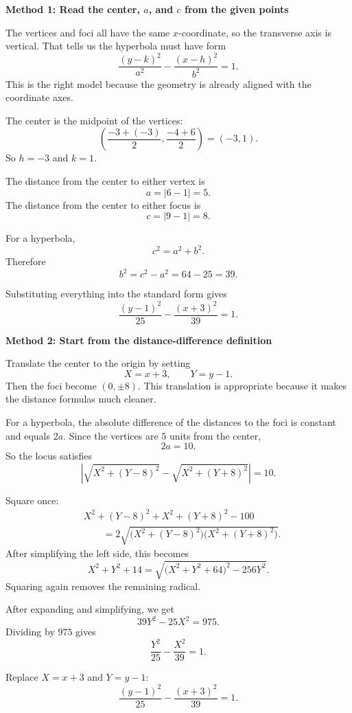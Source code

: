 \documentclass[a4paper,12pt,twocolumn]{article}
\newenvironment{solutionbox}{\begin{framed}}{\end{framed}}
\begin{document}
\begin{solutionbox}
\textbf{Method 1: Read the center, \(a\), and \(c\) from the given points}

\begin{steps}
\item The vertices and foci all have the same \(x\)-coordinate, so the transverse axis is vertical. That tells us the hyperbola must have form
\[
\frac{(y-k)^2}{a^2}-\frac{(x-h)^2}{b^2}=1.
\]
This is the right model because the geometry is already aligned with the coordinate axes.

\item The center is the midpoint of the vertices:
\[
\left(\frac{-3+(-3)}{2},\frac{-4+6}{2}\right)=(-3,1).
\]
So \(h=-3\) and \(k=1\).

\item The distance from the center to either vertex is
\[
a=|6-1|=5.
\]
The distance from the center to either focus is
\[
c=|9-1|=8.
\]

\item For a hyperbola,
\[
c^2=a^2+b^2.
\]
Therefore
\[
b^2=c^2-a^2=64-25=39.
\]

\item Substituting everything into the standard form gives
\[
\boxed{\frac{(y-1)^2}{25}-\frac{(x+3)^2}{39}=1.}
\]
\end{steps}
\end{solutionbox}

\begin{solutionbox}
\textbf{Method 2: Start from the distance-difference definition}

\begin{steps}
\item Translate the center to the origin by setting
\[
X=x+3,\qquad Y=y-1.
\]
Then the foci become \((0,\pm8)\). This translation is appropriate because it makes the distance formulas much cleaner.

\item For a hyperbola, the absolute difference of the distances to the foci is constant and equals \(2a\). Since the vertices are \(5\) units from the center,
\[
2a=10.
\]
So the locus satisfies
\[
\left|\sqrt{X^2+(Y-8)^2}-\sqrt{X^2+(Y+8)^2}\right|=10.
\]

\item Square once:
\[
\begin{aligned}
&X^2+(Y-8)^2+X^2+(Y+8)^2-100\\
&\qquad=2\sqrt{\bigl(X^2+(Y-8)^2\bigr)\bigl(X^2+(Y+8)^2\bigr)}.
\end{aligned}
\]
After simplifying the left side, this becomes
\[
X^2+Y^2+14
=\sqrt{\bigl(X^2+Y^2+64\bigr)^2-256Y^2}.
\]
Squaring again removes the remaining radical.

\item After expanding and simplifying, we get
\[
39Y^2-25X^2=975.
\]
Dividing by \(975\) gives
\[
\frac{Y^2}{25}-\frac{X^2}{39}=1.
\]

\item Replace \(X=x+3\) and \(Y=y-1\):
\[
\boxed{\frac{(y-1)^2}{25}-\frac{(x+3)^2}{39}=1.}
\]
\end{steps}
\end{solutionbox}
\end{document}
